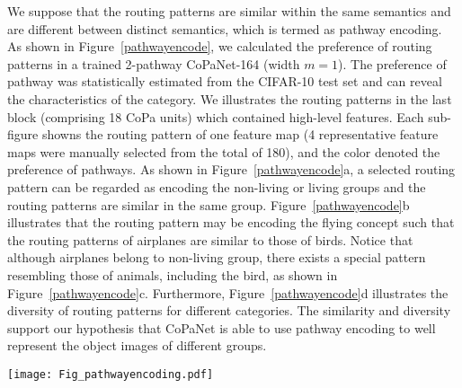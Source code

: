 \documentclass[wcp]{jmlr}
\begin{document}
We suppose that the routing patterns are similar within the same semantics and are different between distinct semantics, which is termed as pathway encoding.
As shown in Figure~\ref{pathwayencode}, we calculated the preference of routing patterns in a trained 2-pathway CoPaNet-164 (width $m=1$). 
The preference of pathway was statistically estimated from the CIFAR-10 test set and can reveal the characteristics of the category.
We illustrates the routing patterns in the last block (comprising 18 CoPa units) which contained high-level features.
Each sub-figure showns the routing pattern of one feature map (4 representative feature maps were manually selected from the total of 180), and the color denoted the preference of pathways.
As shown in Figure~\ref{pathwayencode}a, a selected routing pattern can be regarded as encoding the non-living or living groups and the routing patterns are similar in the same group. 
Figure~\ref{pathwayencode}b illustrates that the routing pattern may be encoding the flying concept such that the routing patterns of airplanes are similar to those of birds.
Notice that although airplanes belong to non-living group, there exists a special pattern resembling those of animals, including the bird, as shown in Figure~\ref{pathwayencode}c. 
Furthermore, Figure~\ref{pathwayencode}d illustrates the diversity of routing patterns for different categories.
The similarity and diversity support our hypothesis that CoPaNet is able to use pathway encoding to well represent the object images of different groups. 

\begin{figure*}
\begin{center}
	\texttt{[image: Fig\_pathwayencoding.pdf]}
\end{center}
   \caption{Routing patterns showing the preference of pathway selection in a trained 2-pathway CoPaNet-164 for the CIFAR-10 test dataset. Red color denotes a preference for the left pathway, blue color for the right pathway, and white color for no preference. The vertical axis denotes the $l$-th CoPa units, where $l$ indicates the depth.  The category information can be represented by the routing pattern, which is referred to as  \textit{pathway encoding} in the proposed work. Each sub-figure denotes the routing pattern that one feature map propagates through its preferred route in the network.
Routing patterns between (a) non-living vs. living, (b) non-flying vs. flying, (c) non-animal vs. animal, and (d) different categories are illustrated. Notice that the airplane category shows the routing pattern of ``bird'' in the ``animal'' group.}
\label{pathwayencode}
\end{figure*}
\end{document}
